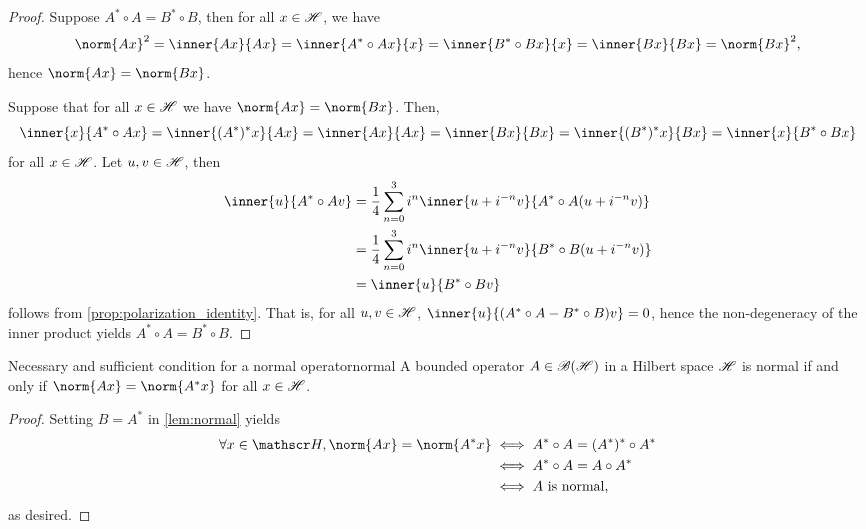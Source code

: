 \begin{proof}
    Suppose \(A^* \circ A = B^* \circ B\), then for all \(x \in \mathscr{H}\), we have
    \begin{equation*}
        \norm{Ax}^2 = \inner{Ax}{Ax} = \inner{A^*\circ Ax}{x} = \inner{B^*\circ Bx}{x} = \inner{Bx}{Bx} = \norm{Bx}^2,
    \end{equation*}
    hence \(\norm{Ax} = \norm{Bx}\).

    Suppose that for all \(x \in \mathscr{H}\) we have \(\norm{Ax} = \norm{Bx}\). Then,
    \begin{equation*}
        \inner{x}{A^* \circ Ax} = \inner{(A^*)^*x}{Ax} = \inner{Ax}{Ax} = \inner{Bx}{Bx} = \inner{(B^*)^*x}{Bx} = \inner{x}{B^* \circ Bx}
    \end{equation*}
    for all \(x \in \mathscr{H}\). Let \(u, v \in \mathscr{H}\), then
    \begin{align*}
        \inner{u}{A^* \circ A v} &= \frac14\sum_{n=0}^3 i^n\inner{u + i^{-n}v}{A^*\circ A(u + i^{-n}v)}\\
                                 &= \frac14 \sum_{n=0}^3 i^n\inner{u + i^{-n}v}{B^* \circ B(u + i^{-n}v)}\\
                                 &= \inner{u}{B^* \circ B v}
    \end{align*}
    follows from \cref{prop:polarization_identity}. That is, for all \(u, v \in \mathscr{H}\), \(\inner{u}{(A^*\circ A - B^*\circ B)v} = 0\), hence the non-degeneracy of the inner product yields \(A^*\circ A = B^*\circ B\).
\end{proof}

\begin{proposition}{Necessary and sufficient condition for a normal operator}{normal}
    A bounded operator \(A \in \mathscr{B}(\mathscr{H})\) in a Hilbert space \(\mathscr{H}\) is normal if and only if \(\norm{Ax} = \norm{A^* x}\) for all \(x \in \mathscr{H}\).
\end{proposition}
\begin{proof}
    Setting \(B = A^*\) in \cref{lem:normal} yields
    \begin{align*}
        \forall x \in \hilbert, \norm{Ax} = \norm{A^*x} &\iff A^*\circ A = (A^*)^*\circ A^*\\
                                                        &\iff A^* \circ A = A \circ A^*\\
                                                        &\iff A\text{ is normal,}
    \end{align*}
    as desired.
\end{proof}

